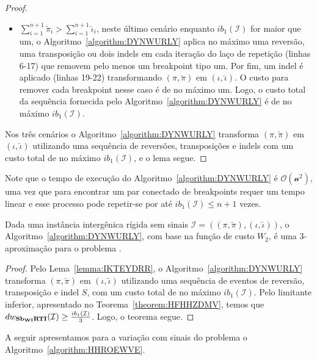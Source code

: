 \begin{proof}
\begin{itemize}
    \item $\sum_{i=1}^{n+1}\breve\pi_i > \sum_{i=1}^{n+1}\breve\iota_i$, neste último cenário enquanto $ib_1(\mathcal{I})$ for maior que um, o Algoritmo~\ref{algorithm:DYNWURLY} aplica no máximo uma reversão, uma transposição ou dois indels em cada iteração do laço de repetição (linhas 6-17) que removem pelo menos um breakpoint tipo um. Por fim, um indel é aplicado (linhas 19-22) transformando $(\pi,\breve\pi)$ em $(\iota,\breve\iota)$. O custo para remover cada breakpoint nesse caso é de no máximo um. Logo, o custo total da sequência fornecida pelo Algoritmo~\ref{algorithm:DYNWURLY} é de no máximo $ib_1(\mathcal{I})$. 
  \end{itemize}
  Nos três cenários o Algoritmo~\ref{algorithm:DYNWURLY} transforma $(\pi,\breve\pi)$ em $(\iota,\breve\iota)$ utilizando uma sequência de reversões, transposições e indels com um custo total de no máximo $ib_1(\mathcal{I})$, e o lema segue.
\end{proof}

Note que o tempo de execução do Algoritmo~\ref{algorithm:DYNWURLY} é $\mathcal{O(n^2)}$, uma vez que para encontrar um par conectado de breakpoints requer um tempo linear e esse processo pode repetir-se por até $ib_1(\mathcal{I}) \le n + 1$ vezes.

\begin{theorem}\label{theorem:HXFXWAIA}
Dada uma instância intergênica rígida sem sinais $\mathcal{I}=((\pi,\breve\pi),(\iota,\breve\iota))$, o Algoritmo~\ref{algorithm:DYNWURLY}, com base na função de custo $W_2$, é uma $3$-aproximação para o problema \SbWIRTI{}.
\end{theorem}
\begin{proof}
Pelo Lema~\ref{lemma:IKTEYDRR}, o Algoritmo~\ref{algorithm:DYNWURLY} transforma $(\pi,\breve\pi)$ em $(\iota,\breve\iota)$ utilizando uma sequência de eventos de reversão, transposição e indel $S$, com um custo total de no máximo $ib_1(\mathcal{I})$. Pelo limitante inferior, apresentado no Teorema~\ref{theorem:HFHHZDMV}, temos que $dw_{\textbf{Sb\textsubscript{WI}RTI}}(\mathcal{I}) \ge \frac{ib_1(\mathcal{I})}{3}$. Logo, o teorema segue.
\end{proof}

A seguir apresentamos para a variação com sinais do problema \SbWIRTI{} o Algoritmo~\ref{algorithm:HHROEWVE}.




